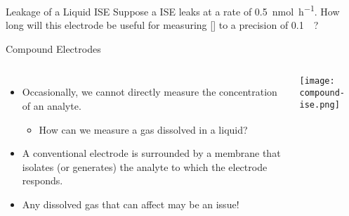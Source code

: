 \documentclass[notes=only]{beamer}
\begin{document}

\begin{frame}[t]{Leakage of a Liquid ISE}
	Suppose a  ISE leaks at a rate of
	\SI{0.5}{\nano\mole\per\hour}. How long will this electrode be useful
	for measuring [] to a precision of \SI{0.1}{\micro\Molar}?

	\note{}
\end{frame}

\clearpage

\begin{frame}{Compound Electrodes}
	\begin{columns}
		\begin{itemize}
			\item Occasionally, we cannot directly measure the
				concentration of an analyte.
				\begin{itemize}
					\item How can we measure a gas dissolved
						in a liquid?
				\end{itemize}
			\item  A conventional electrode is surrounded by a
				membrane that isolates (or generates) the
				analyte to which the electrode responds.
			\item Any dissolved gas that can affect \pH{} may be an
				issue!
		\end{itemize}
		\begin{center}
			\texttt{[image: compound-ise.png]}
		\end{center}
	\end{columns}
\end{frame}

\end{document}
